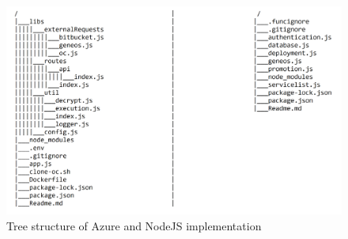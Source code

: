 \documentclass[a4paper,11pt, pagesize]{scrartcl}
\begin{document}
\begin{spacing}{1.2}
\begin{figure}[H]
\label{fig:tree2}
\centering
\includegraphics[width=1\textwidth]{tree2.png}
\caption{Tree structure of Azure and NodeJS implementation}
\end{figure} 
\newpage

\end{spacing}
\end{document}
